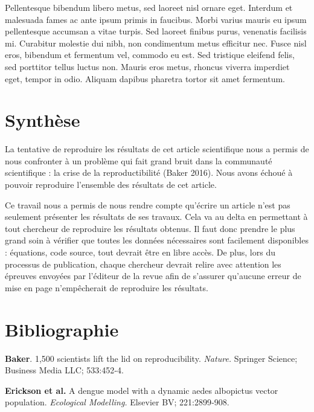 \documentclass[
  12pt,
  french,
  oneside]{article}
\begin{document}
Pellentesque bibendum libero metus, sed laoreet nisl ornare eget.
Interdum et malesuada fames ac ante ipsum primis in faucibus. Morbi
varius mauris eu ipsum pellentesque accumsan a vitae turpis. Sed laoreet
finibus purus, venenatis facilisis mi. Curabitur molestie dui nibh, non
condimentum metus efficitur nec. Fusce nisl eros, bibendum et fermentum
vel, commodo eu est. Sed tristique eleifend felis, sed porttitor tellus
luctus non. Mauris eros metus, rhoncus viverra imperdiet eget, tempor in
odio. Aliquam dapibus pharetra tortor sit amet fermentum.

\hypertarget{synthuxe8se}{%
\section{Synthèse}\label{synthuxe8se}}

La tentative de reproduire les résultats de cet article scientifique
nous a permis de nous confronter à un problème qui fait grand bruit dans
la communauté scientifique : la crise de la reproductibilité (Baker
2016). Nous avons échoué à pouvoir reproduire l'ensemble des résultats
de cet article.

Ce travail nous a permis de nous rendre compte qu'écrire un article
n'est pas seulement présenter les résultats de ses travaux. Cela va au
delta en permettant à tout chercheur de reproduire les résultats
obtenus. Il faut donc prendre le plus grand soin à vérifier que toutes
les données nécessaires sont facilement disponibles : équations, code
source, tout devrait être en libre accès. De plus, lors du processus de
publication, chaque chercheur devrait relire avec attention les épreuves
envoyées par l'éditeur de la revue afin de s'assurer qu'aucune erreur de
mise en page n'empêcherait de reproduire les résultats.

\hypertarget{bibliographie}{%
\section*{Bibliographie}\label{bibliographie}}

\hypertarget{refs}{}
\leavevmode\hypertarget{ref-Baker_2016}{}%
\textbf{Baker}. 1,500 scientists lift the lid on reproducibility.
\emph{Nature.} Springer Science; Business Media LLC; 533:452‑4.

\leavevmode\hypertarget{ref-Erickson_2010}{}%
\textbf{Erickson et al.} A dengue model with a dynamic aedes albopictus
vector population. \emph{Ecological Modelling.} Elsevier BV;
221:2899‑908.
\end{document}
